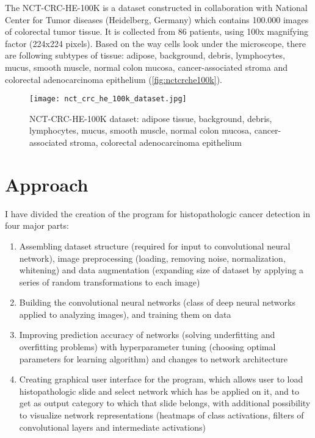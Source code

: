 The NCT-CRC-HE-100K is a dataset constructed in collaboration with National Center for Tumor diseases (Heidelberg, Germany) which contains 100.000 images of colorectal tumor tissue. It is collected from 86 patients, using 100x magnifying factor (224x224 pixels). Based on the way cells look under the microscope, there are following subtypes of tissue: adipose, background, debris, lymphocytes, mucus, smooth muscle, normal colon mucosa, cancer-associated stroma and colorectal adenocarcinoma epithelium (\textcolor{red}{\autoref{fig:nctcrche100k}}).

\begin{figure}[h]
	\centering
	\texttt{[image: nct\_crc\_he\_100k\_dataset.jpg]}
	\caption{NCT-CRC-HE-100K dataset: adipose tissue, background, debris, lymphocytes, mucus, smooth muscle, normal colon mucosa, cancer-associated stroma, colorectal adenocarcinoma epithelium}
	\label{fig:nctcrche100k}
\end{figure}

\section{Approach}

I have divided the creation of the program for histopathologic cancer detection in four major parts:
\begin{enumerate}
	\itemsep0em
	\item Assembling dataset structure (required for input to convolutional neural network), image preprocessing (loading, removing noise, normalization, whitening) and data augmentation (expanding size of dataset by applying a series of random transformations to each image)
	\item Building the convolutional neural networks (class of deep neural networks applied to analyzing images), and training them on data
	\item Improving prediction accuracy of networks (solving underfitting and overfitting problems) with hyperparameter tuning (choosing optimal parameters for learning algorithm) and changes to network architecture
	\item Creating graphical user interface for the program, which allows user to load histopathologic slide and select network which has be applied on it, and to get as output category to which that slide belongs, with additional possibility to visualize network representations (heatmaps of class activations, filters of convolutional layers and intermediate activations)
\end{enumerate}

